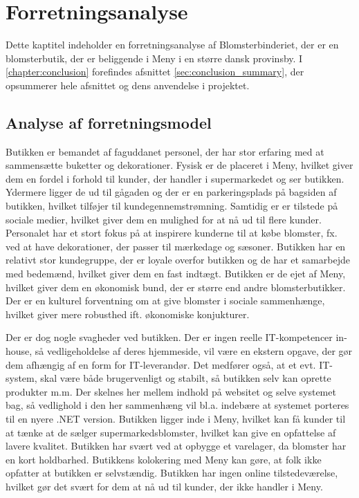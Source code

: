 \chapter{Forretningsanalyse}
\label{chapter:forretningsanalyse}

Dette kaptitel indeholder en forretningsanalyse af Blomsterbinderiet, der er en blomsterbutik, der er beliggende i Meny i en større dansk provinsby.
I \ref{chapter:conclusion} forefindes afsnittet \ref{sec:conclusion_summary}, der opsummerer hele afsnittet og dens anvendelse i projektet.

\section{Analyse af forretningsmodel}
Butikken er bemandet af faguddanet personel, der har stor erfaring med at sammensætte buketter og dekorationer. 
Fysisk er de placeret i Meny, hvilket giver dem en fordel i forhold til kunder, der handler i supermarkedet og ser butikken. Ydermere ligger de ud til gågaden og der er en parkeringsplads på bagsiden af butikken, hvilket tilføjer til kundegennemstrømning. 
Samtidig er er tilstede på sociale medier, hvilket giver dem en mulighed for at nå ud til flere kunder.
Personalet har et stort fokus på at inspirere kunderne til at købe blomster, fx. ved at have dekorationer, der passer til mærkedage og sæsoner. 
Butikken har en relativt stor kundegruppe, der er loyale overfor butikken og de har et samarbejde med bedemænd, hvilket giver dem en fast indtægt. 
Butikken er de ejet af Meny, hvilket giver dem en økonomisk bund, der er større end andre blomsterbutikker.
Der er en kulturel forventning om at give blomster i sociale sammenhænge, hvilket giver mere robusthed ift. økonomiske konjukturer.

Der er dog nogle svagheder ved butikken. 
Der er ingen reelle IT-kompetencer in-house, så vedligeholdelse af deres hjemmeside, vil være en ekstern opgave, der gør dem afhængig af en form for IT-leverandør.
Det medfører også, at et evt. IT-system, skal være både brugervenligt og stabilt, så butikken selv kan oprette produkter m.m. 
Der skelnes her mellem indhold på websitet og selve systemet bag, så vedlighold i den her sammenhæng vil bl.a. indebære at systemet porteres til en nyere .NET version.
Butikken ligger inde i Meny, hvilket kan få kunder til at tænke at de sælger supermarkedsblomster, hvilket kan give en opfattelse af lavere kvalitet.
Butikken har svært ved at opbygge et varelager, da blomster har en kort holdbarhed.
Butikkens kolokering med Meny kan gøre, at folk ikke opfatter at butikken er selvstændig.
Butikken har ingen online tilstedeværelse, hvilket gør det svært for dem at nå ud til kunder, der ikke handler i Meny.

